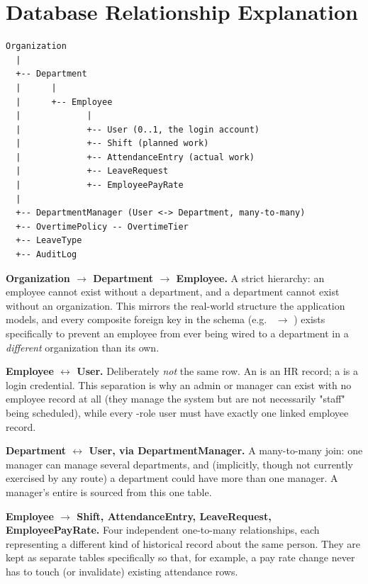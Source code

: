\section{Database Relationship Explanation}

\begin{lstlisting}[basicstyle=\ttfamily\small,frame=single]
Organization
  |
  +-- Department
  |      |
  |      +-- Employee
  |             |
  |             +-- User (0..1, the login account)
  |             +-- Shift (planned work)
  |             +-- AttendanceEntry (actual work)
  |             +-- LeaveRequest
  |             +-- EmployeePayRate
  |
  +-- DepartmentManager (User <-> Department, many-to-many)
  +-- OvertimePolicy -- OvertimeTier
  +-- LeaveType
  +-- AuditLog
\end{lstlisting}

\textbf{Organization $\to$ Department $\to$ Employee.} A strict
hierarchy: an employee cannot exist without a department, and a
department cannot exist without an organization. This mirrors the
real-world structure the application models, and every composite
foreign key in the schema (e.g.\  $\to$ )
exists specifically to prevent an employee from ever being wired to a
department in a \emph{different} organization than its own.

\textbf{Employee $\leftrightarrow$ User.} Deliberately \emph{not} the
same row. An  is an HR record; a  is a login
credential. This separation is why an admin or manager can exist with
no employee record at all (they manage the system but are not
necessarily "staff" being scheduled), while every -role
user must have exactly one linked employee record.

\textbf{Department $\leftrightarrow$ User, via DepartmentManager.} A
many-to-many join: one manager can manage several departments, and
(implicitly, though not currently exercised by any route) a department
could have more than one manager. A manager's entire
 is sourced from this one table.

\textbf{Employee $\to$ Shift, AttendanceEntry, LeaveRequest,
EmployeePayRate.} Four independent one-to-many relationships, each
representing a different kind of historical record about the same
person. They are kept as separate tables specifically so that, for
example, a pay rate change never has to touch (or invalidate) existing
attendance rows.

